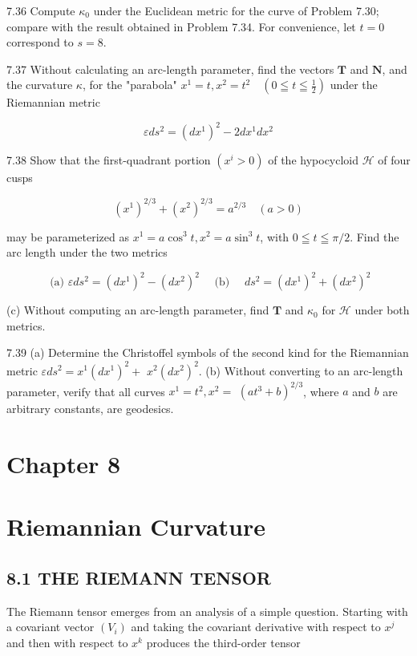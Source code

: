 \documentclass[10pt]{article}
\begin{document}
7.36 Compute $\kappa_{0}$ under the Euclidean metric for the curve of Problem 7.30; compare with the result obtained in Problem 7.34. For convenience, let $t=0$ correspond to $s=8$.

7.37 Without calculating an arc-length parameter, find the vectors $\mathbf{T}$ and $\mathbf{N}$, and the curvature $\kappa$, for the "parabola" $x^{1}=t, x^{2}=t^{2} \quad\left(0 \leqq t \leqq \frac{1}{2}\right)$ under the Riemannian metric

$$
\varepsilon d s^{2}=\left(d x^{1}\right)^{2}-2 d x^{1} d x^{2}
$$

7.38 Show that the first-quadrant portion $\left(x^{i}>0\right)$ of the hypocycloid $\mathscr{H}$ of four cusps

$$
\left(x^{1}\right)^{2 / 3}+\left(x^{2}\right)^{2 / 3}=a^{2 / 3} \quad(a>0)
$$

may be parameterized as $x^{1}=a \cos ^{3} t, x^{2}=a \sin ^{3} t$, with $0 \leqq t \leqq \pi / 2$. Find the arc length under the two metrics

$$
\text { (a) } \varepsilon d s^{2}=\left(d x^{1}\right)^{2}-\left(d x^{2}\right)^{2} \quad \text { (b) } \quad d s^{2}=\left(d x^{1}\right)^{2}+\left(d x^{2}\right)^{2}
$$

(c) Without computing an arc-length parameter, find $\mathbf{T}$ and $\kappa_{0}$ for $\mathscr{H}$ under both metrics.

7.39 (a) Determine the Christoffel symbols of the second kind for the Riemannian metric $\varepsilon d s^{2}=x^{1}\left(d x^{1}\right)^{2}+$ $x^{2}\left(d x^{2}\right)^{2}$. (b) Without converting to an arc-length parameter, verify that all curves $x^{1}=t^{2}, x^{2}=$ $\left(a t^{3}+b\right)^{2 / 3}$, where $a$ and $b$ are arbitrary constants, are geodesics.

\section*{Chapter 8}
\section*{Riemannian Curvature}
\subsection*{8.1 THE RIEMANN TENSOR}
The Riemann tensor emerges from an analysis of a simple question. Starting with a covariant vector $\left(V_{i}\right)$ and taking the covariant derivative with respect to $x^{j}$ and then with respect to $x^{k}$ produces the third-order tensor
\end{document}
